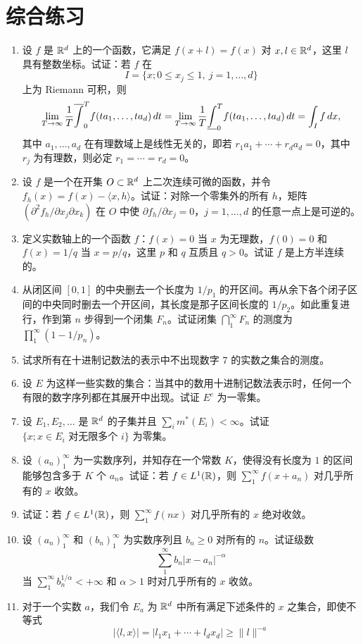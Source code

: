 \chapter*{综合练习}
\newcommand{\ExItem}[1]{\item\hypertarget{ex:#1}{}\label{ex:#1}}
\begin{enumerate}[label=\textbf{\arabic*.},itemsep=.8em]
\ExItem{1} 设 $f$ 是 $\mathbb R^d$ 上的一个函数，它满足 $f(x+l)=f(x)$ 对 $x,l\in\mathbb R^d$，这里 $l$ 具有整数坐标。试证：若 $f$ 在
\[I=\{x;0\le x_j\le1,\ j=1,\ldots,d\}\]
上为 Riemann 可积，则
\[\lim_{T\to\infty}\frac1T\overline{\int}_0^T f(ta_1,\ldots,ta_d)\,dt
=\lim_{T\to\infty}\frac1T\underline{\int}_0^T f(ta_1,\ldots,ta_d)\,dt=\int_I f\,dx,\]
其中 $a_1,\ldots,a_d$ 在有理数域上是线性无关的，即若 $r_1a_1+\cdots+r_da_d=0$，其中 $r_j$ 为有理数，则必定 $r_1=\cdots=r_d=0$。
\ExItem{2} 设 $f$ 是一个在开集 $O\subset\mathbb R^d$ 上二次连续可微的函数，并令 $f_h(x)=f(x)-\langle x,h\rangle$。试证：对除一个零集外的所有 $h$，矩阵 $(\partial^2 f_h/\partial x_j\partial x_k)$ 在 $O$ 中使 $\partial f_h/\partial x_j=0$，$j=1,\ldots,d$ 的任意一点上是可逆的。
\ExItem{3} 定义实数轴上的一个函数 $f$：$f(x)=0$ 当 $x$ 为无理数，$f(0)=0$ 和 $f(x)=1/q$ 当 $x=p/q$，这里 $p$ 和 $q$ 互质且 $q>0$。试证 $f$ 是上方半连续的。
\ExItem{4} 从闭区间 $[0,1]$ 的中央删去一个长度为 $1/p_1$ 的开区间。再从余下各个闭子区间的中央同时删去一个开区间，其长度是那子区间长度的 $1/p_2$。如此重复进行，作到第 $n$ 步得到一个闭集 $F_n$。试证闭集 $\bigcap_1^\infty F_n$ 的测度为 $\prod_1^\infty(1-1/p_n)$。
\ExItem{5} 试求所有在十进制记数法的表示中不出现数字 $7$ 的实数之集合的测度。
\ExItem{6} 设 $E$ 为这样一些实数的集合：当其中的数用十进制记数法表示时，任何一个有限的数字序列都在其展开中出现。试证 $E^c$ 为一零集。
\ExItem{7} 设 $E_1,E_2,\ldots$ 是 $\mathbb R^d$ 的子集并且 $\sum_i m^*(E_i)<\infty$。试证 $\{x;x\in E_i\text{ 对无限多个 }i\}$ 为零集。
\ExItem{8} 设 $(a_n)_1^\infty$ 为一实数序列，并知存在一个常数 $K$，使得没有长度为 $1$ 的区间能够包含多于 $K$ 个 $a_n$。试证：若 $f\in L^1(\mathbb R)$，则 $\sum_1^\infty f(x+a_n)$ 对几乎所有的 $x$ 收敛。
\ExItem{9} 试证：若 $f\in L^1(\mathbb R)$，则 $\sum_1^\infty f(nx)$ 对几乎所有的 $x$ 绝对收敛。
\ExItem{10} 设 $(a_n)_1^\infty$ 和 $(b_n)_1^\infty$ 为实数序列且 $b_n\ge0$ 对所有的 $n$。试证级数
\[\sum_1^\infty b_n|x-a_n|^{-\alpha}\]
当 $\sum_1^\infty b_n^{1/\alpha}<+\infty$ 和 $\alpha>1$ 时对几乎所有的 $x$ 收敛。
\ExItem{11} 对于一个实数 $a$，我们令 $E_a$ 为 $\mathbb R^d$ 中所有满足下述条件的 $x$ 之集合，即使不等式
\[|\langle l,x\rangle|=|l_1x_1+\cdots+l_dx_d|\ge\|l\|^{-a}\]

\end{enumerate}
